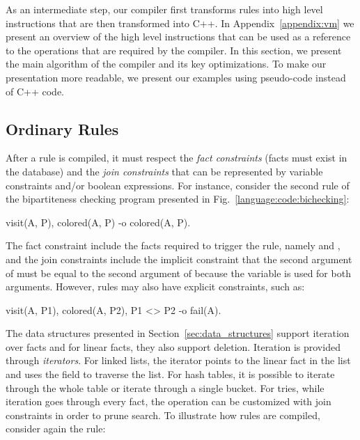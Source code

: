 As an intermediate step, our compiler first transforms rules into high level
instructions that are then transformed into C++. In Appendix~\ref{appendix:vm}
we present an overview of the high level instructions that can be used as a
reference to the operations that are required by the compiler. In this section,
we present the main algorithm of the compiler and its key optimizations. To make
our presentation more readable, we present our examples using pseudo-code
instead of C++ code.

\subsection{Ordinary Rules}\label{sec:compile}

After a rule is compiled, it must respect the \emph{fact constraints}
(facts must exist in the database) and the \emph{join constraints} that can be
represented by variable constraints and/or boolean expressions. For instance,
consider the second rule of the bipartiteness checking program presented in
Fig.~\ref{language:code:bichecking}:

\begin{Code}
visit(A, P),
colored(A, P)
   -o colored(A, P).
\end{Code}

The fact constraint include the facts required to trigger the rule, namely
 and , and the join constraints include
the implicit constraint that the second argument of  must be equal
to the second argument of  because the variable  is used
for both arguments. However, rules may also have explicit constraints, such as:

\begin{Code}
visit(A, P1),
colored(A, P2),
P1 <> P2
   -o fail(A).
\end{Code}

The data structures presented in Section~\ref{sec:data_structures} support
iteration over facts and for linear facts, they also support deletion. Iteration
is provided through \emph{iterators}. For linked lists, the iterator points to
the linear fact in the list and uses the  field to traverse the list.
For hash tables, it is possible to iterate through the whole table or iterate
through a single bucket. For tries, while iteration goes through every fact, the
operation can be customized with join constraints in order to prune search. To
illustrate how rules are compiled, consider again the rule:

